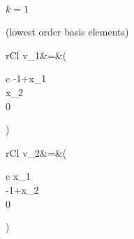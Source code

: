 \paragraph{$k=1$} (lowest order basis elements)\\[5pt] %
\label{par:_k_0_}
\begin{IEEEeqnarraybox*}{rCl}
	v_1&=&\left(
		\begin{array}{c}
			-1+x_1\\
			x_2\\[3pt]
			0\\
		\end{array}
	\right)
\end{IEEEeqnarraybox*}
\begin{IEEEeqnarraybox*}{rCl}
	v_2&=&\left(
		\begin{array}{c}
			x_1\\
			-1+x_2\\[3pt]
			0\\
		\end{array}
	\right)
\end{IEEEeqnarraybox*}
